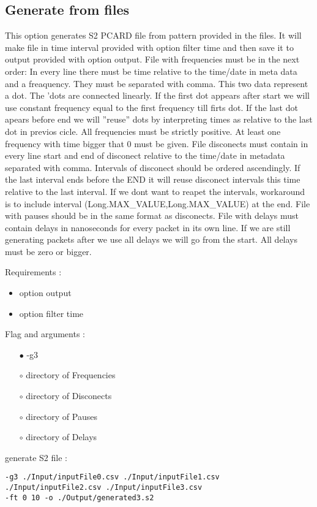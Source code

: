 \documentclass[english]{article}
\begin{document}
\subsection{Generate from files}
This option generates S2 PCARD file from pattern provided in the files. It will make file in time interval provided with option filter time and then save it to output provided with option output. File with frequencies must be in the next order: In every line there must be time relative to the time/date in meta data and a freaquency. They must be separated with comma. This two data represent a dot. The 'dots are connected linearly. If the first dot appears after start we will use constant frequency equal to the first frequency till firts dot. If the last dot apears before end we will ''reuse'' dots by interpreting times as relative to the last dot in previos cicle. All frequencies must be strictly positive. At least one frequency with time bigger that 0 must be given. File disconects must contain in every line start and end of disconect relative to the time/date in metadata separated with comma. Intervals of disconect should be ordered ascendingly. If the last interval ends before the END it will reuse disconect intervals this time relative to the last interval. If we dont want to reapet the intervals, workaround is to include interval (Long.MAX\_VALUE,Long.MAX\_VALUE) at the end. File with pauses should be in the same format as disconects. File with delays must contain delays in nanoseconds for every packet in its own line. If we are still generating packets after we use all delays we will go from the start. All delays must be zero or bigger.

\noindent Requirements : 
\begin{itemize}
\item option output
\item option filter time
\end{itemize}
Flag and arguments :

\begin{itemize}
\item[$\bullet$] -g3
\item[$\circ$] directory of Frequencies
\item[$\circ$] directory of Disconects
\item[$\circ$] directory of Pauses
\item[$\circ$] directory of Delays


\end{itemize}
generate S2 file : 
\begin{lstlisting} 
-g3 ./Input/inputFile0.csv ./Input/inputFile1.csv
./Input/inputFile2.csv ./Input/inputFile3.csv 
-ft 0 10 -o ./Output/generated3.s2
\end{lstlisting}
\end{document}
